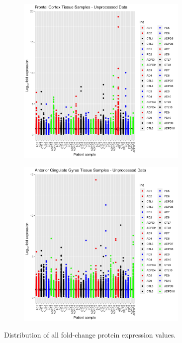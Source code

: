 \begin{figure}[H]
\begin{subfigure}[b]{0.5\linewidth}
\centering
\includegraphics[width=0.9\textwidth]{./Figures/Fig1a/Fig1a-FrontalCortex.png}\par
\end{subfigure}%
\begin{subfigure}[b]{0.5\linewidth}
\centering
\includegraphics[width=0.9\textwidth]{./Figures/Fig1a/Fig1a-AnteriorCingulateGyrus.png}\par
\end{subfigure}%
\caption{\label{fig1a}
Distribution of all fold-change protein expression values.}
\end{figure}

